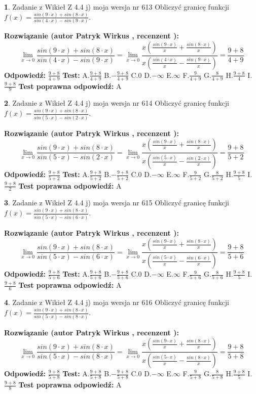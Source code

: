 \documentclass[12pt, a4paper]{article}
\theoremstyle{definition} %
\newtheorem{zad}{}
\newcommand{\zadStart}[1]{\begin{zad}#1\newline}
\newcommand{\zadStop}{\end{zad}}
\newcommand{\rozwStart}[2]{\noindent \textbf{Rozwiązanie (autor #1 , recenzent #2): }\newline}
\newcommand{\rozwStop}{\newline}
\newcommand{\odpStart}{\noindent \textbf{Odpowiedź:}\newline}
\newcommand{\odpStop}{\newline}
\newcommand{\testStart}{\noindent \textbf{Test:}\newline}
\newcommand{\testStop}{\newline}
\newcommand{\kluczStart}{\noindent \textbf{Test poprawna odpowiedź:}\newline}
\newcommand{\kluczStop}{\newline}
\begin{document}
\zadStart{Zadanie z Wikieł Z 4.4 j) moja wersja nr 613}
Obliczyć granicę funkcji $f(x)=\frac{sin(9\cdot x) +sin(8\cdot x)}{sin(4\cdot x) -sin(9\cdot x)}$.
\zadStop
\rozwStart{Patryk Wirkus}{}
$$\lim\limits_{x\to 0}\frac{sin(9\cdot x) +sin(8\cdot x)}{sin(4\cdot x) -sin(9\cdot x)}=\lim\limits_{x\to 0}\frac{x(\frac{sin(9\cdot x)}{x}+\frac{sin(8\cdot x)}{x})}{x(\frac{sin(4\cdot x)}{x}-\frac{sin(9\cdot x)}{x})}=\frac{9+8}{4+9}$$
\rozwStop
\odpStart
$\frac{9+8}{4+9}$
\odpStop
\testStart
A.$\frac{9+8}{4+9}$
B.$-\frac{9+8}{4+9}$
C.$0$
D.$-\infty$
E.$\infty$
F.$\frac{9}{4+9}$
G.$\frac{8}{4+9}$
H.$\frac{9+8}{4}$
I.$\frac{9+8}{9}$
\testStop
\kluczStart
A
\kluczStop



\zadStart{Zadanie z Wikieł Z 4.4 j) moja wersja nr 614}
Obliczyć granicę funkcji $f(x)=\frac{sin(9\cdot x) +sin(8\cdot x)}{sin(5\cdot x) -sin(2\cdot x)}$.
\zadStop
\rozwStart{Patryk Wirkus}{}
$$\lim\limits_{x\to 0}\frac{sin(9\cdot x) +sin(8\cdot x)}{sin(5\cdot x) -sin(2\cdot x)}=\lim\limits_{x\to 0}\frac{x(\frac{sin(9\cdot x)}{x}+\frac{sin(8\cdot x)}{x})}{x(\frac{sin(5\cdot x)}{x}-\frac{sin(2\cdot x)}{x})}=\frac{9+8}{5+2}$$
\rozwStop
\odpStart
$\frac{9+8}{5+2}$
\odpStop
\testStart
A.$\frac{9+8}{5+2}$
B.$-\frac{9+8}{5+2}$
C.$0$
D.$-\infty$
E.$\infty$
F.$\frac{9}{5+2}$
G.$\frac{8}{5+2}$
H.$\frac{9+8}{5}$
I.$\frac{9+8}{2}$
\testStop
\kluczStart
A
\kluczStop



\zadStart{Zadanie z Wikieł Z 4.4 j) moja wersja nr 615}
Obliczyć granicę funkcji $f(x)=\frac{sin(9\cdot x) +sin(8\cdot x)}{sin(5\cdot x) -sin(6\cdot x)}$.
\zadStop
\rozwStart{Patryk Wirkus}{}
$$\lim\limits_{x\to 0}\frac{sin(9\cdot x) +sin(8\cdot x)}{sin(5\cdot x) -sin(6\cdot x)}=\lim\limits_{x\to 0}\frac{x(\frac{sin(9\cdot x)}{x}+\frac{sin(8\cdot x)}{x})}{x(\frac{sin(5\cdot x)}{x}-\frac{sin(6\cdot x)}{x})}=\frac{9+8}{5+6}$$
\rozwStop
\odpStart
$\frac{9+8}{5+6}$
\odpStop
\testStart
A.$\frac{9+8}{5+6}$
B.$-\frac{9+8}{5+6}$
C.$0$
D.$-\infty$
E.$\infty$
F.$\frac{9}{5+6}$
G.$\frac{8}{5+6}$
H.$\frac{9+8}{5}$
I.$\frac{9+8}{6}$
\testStop
\kluczStart
A
\kluczStop



\zadStart{Zadanie z Wikieł Z 4.4 j) moja wersja nr 616}
Obliczyć granicę funkcji $f(x)=\frac{sin(9\cdot x) +sin(8\cdot x)}{sin(5\cdot x) -sin(8\cdot x)}$.
\zadStop
\rozwStart{Patryk Wirkus}{}
$$\lim\limits_{x\to 0}\frac{sin(9\cdot x) +sin(8\cdot x)}{sin(5\cdot x) -sin(8\cdot x)}=\lim\limits_{x\to 0}\frac{x(\frac{sin(9\cdot x)}{x}+\frac{sin(8\cdot x)}{x})}{x(\frac{sin(5\cdot x)}{x}-\frac{sin(8\cdot x)}{x})}=\frac{9+8}{5+8}$$
\rozwStop
\odpStart
$\frac{9+8}{5+8}$
\odpStop
\testStart
A.$\frac{9+8}{5+8}$
B.$-\frac{9+8}{5+8}$
C.$0$
D.$-\infty$
E.$\infty$
F.$\frac{9}{5+8}$
G.$\frac{8}{5+8}$
H.$\frac{9+8}{5}$
I.$\frac{9+8}{8}$
\testStop
\kluczStart
A
\kluczStop
\end{document}
